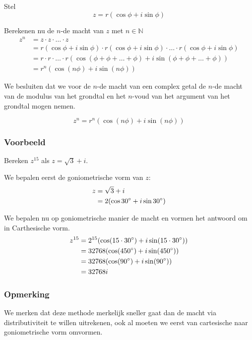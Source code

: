\documentclass[12pt,twoside,a4paper]{article}
\begin{document}
Stel
\[z = r (\cos \phi + i \sin \phi )\]

Berekenen nu de $n$-de macht van $z$ met $n\in\mathbb{N}$
\begin{align*}
  z^n &= z \cdot z \cdot \ldots \cdot z\\
      &= r (\cos \phi + i \sin \phi ) \cdot r (\cos \phi + i \sin \phi ) \cdot \ldots \cdot r (\cos \phi + i \sin \phi )\\
      &= r \cdot r \cdot \ldots \cdot r (\cos( \phi + \phi + \ldots + \phi ) + i \sin( \phi + \phi + \ldots + \phi ))\\
      &= r^n \left(\cos(n\phi) + i\sin(n\phi)\right)
\end{align*}

We besluiten dat we voor de $n$-de macht van een complex getal de $n$-de macht van de modulus van het grondtal en het $n$-voud van het argument van het grondtal mogen nemen.

\begin{mdframed}
  \[
    z^n = r^n \left(\cos(n\phi) + i\sin(n\phi)\right)
  \]
\end{mdframed}

\subsubsection*{Voorbeeld}

Bereken $z^{15}$ als $z=\sqrt{3} + i$.

We bepalen eerst de goniometrische vorm van $z$:
\begin{align*}
  z &= \sqrt{3} + i\\
    &= 2(\cos30^\circ + i\sin30^\circ)
\end{align*}

We bepalen nu op goniometrische manier de macht en vormen het antwoord om in Carthesische vorm.
\begin{align*}
  z^{15} &= 2^{15}(\cos(15 \cdot 30^\circ) + i\sin(15 \cdot 30^\circ))\\
         &= 32768(\cos(450^\circ) + i\sin(450^\circ))\\
         &= 32768(\cos(90^\circ) + i\sin(90^\circ))\\
         &= 32768i
\end{align*}

\subsubsection*{Opmerking}
We merken dat deze methode merkelijk sneller gaat dan de macht via distributiviteit te willen uitrekenen, ook al moeten we eerst van cartesische naar goniometrische vorm omvormen.
\end{document}
